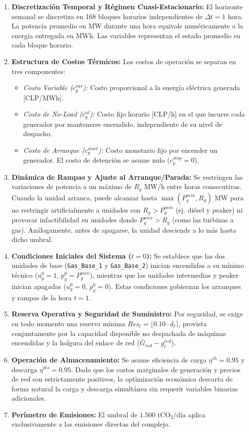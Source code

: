 \documentclass[10pt,letterpaper]{article}
\begin{document}
\begin{enumerate}
    \item \textbf{Discretización Temporal y Régimen Cuasi-Estacionario:} El horizonte semanal se discretiza en 168 bloques horarios independientes de $\Delta t = 1$ hora. La potencia promedio en MW durante una hora equivale numéricamente a la energía entregada en MWh. Las variables representan el estado promedio en cada bloque horario.
    \item \textbf{Estructura de Costos Térmicos:} Los costos de operación se separan en tres componentes:
    \begin{itemize}
        \item \textit{Costo Variable ($c_g^{var}$):} Costo proporcional a la energía eléctrica generada [CLP/MWh].
        \item \textit{Costo de No-Load ($c_g^{nl}$):} Costo fijo horario [CLP/h] en el que incurre cada generador por mantenerse encendido, independiente de su nivel de despacho.
        \item \textit{Costo de Arranque ($c_g^{start}$):} Costo monetario fijo por encender un generador. El costo de detención se asume nulo ($c_g^{stop} = 0$).
    \end{itemize}
    \item \textbf{Dinámica de Rampas y Ajuste al Arranque/Parada:} Se restringen las variaciones de potencia a un máximo de $R_g$ MW/h entre horas consecutivas. Cuando la unidad arranca, puede alcanzar hasta $\max(P_g^{min}, R_g)$ MW para no restringir artificialmente a unidades con $R_g > P_g^{min}$ (ej. diésel y peaker) ni provocar infactibilidad en unidades donde $P_g^{min} > R_g$ (como las turbinas a gas). Análogamente, antes de apagarse, la unidad desciende a lo más hasta dicho umbral.
    \item \textbf{Condiciones Iniciales del Sistema ($t=0$):} Se establece que las dos unidades de base (\texttt{Gas\_Base\_1} y \texttt{Gas\_Base\_2}) inician encendidas a su mínimo técnico ($u_g^0 = 1$, $p_g^0 = P_g^{min}$), mientras que las unidades intermedias y peaker inician apagadas ($u_g^0 = 0$, $p_g^0 = 0$). Estas condiciones gobiernan los arranques y rampas de la hora $t=1$.
    \item \textbf{Reserva Operativa y Seguridad de Suministro:} Por seguridad, se exige en todo momento una reserva mínima $Res_t = \lfloor 0.10 \cdot d_t \rceil$, provista conjuntamente por la capacidad disponible no despachada de máquinas encendidas y la holgura del enlace de red ($\bar{G}_{red} - g_t^{red}$).
    \item \textbf{Operación de Almacenamiento:} Se asume eficiencia de carga $\eta^{ch} = 0.95$ y descarga $\eta^{dis} = 0.95$. Dado que los costos marginales de generación y precios de red son estrictamente positivos, la optimización económica descarta de forma natural la carga y descarga simultánea sin requerir variables binarias adicionales.
    \item \textbf{Perímetro de Emisiones:} El umbral de $1.500 \text{ tCO}_2$/día aplica exclusivamente a las emisiones directas del complejo.
\end{enumerate}
\end{document}
